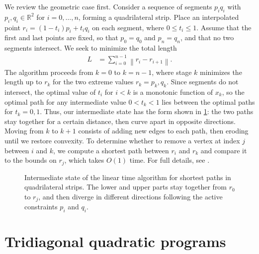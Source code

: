 \documentclass[11pt]{article}
\newcommand{\R}{\mathbb{R}}
\begin{document}
We review the geometric case first.  Consider a sequence of segments $p_i q_i$ with $p_i, q_i \in \R^2$ for $i = 0, \ldots, n$, forming a quadrilateral strip.  Place an interpolated point
$r_i = (1-t_i) p_i + t_i q_i$ on each segment, where $0 \le t_i \le 1$.  Assume that the first and last points are fixed, so that $p_0 = q_0$ and $p_n = q_n$, and that no two segments intersect.
We seek to minimize the total length
\begin{align*}
L &= \sum_{i=0}^{n-1} \left\| r_i - r_{i+1} \right\|.
\end{align*}
The algorithm proceeds from $k = 0$ to $k = n-1$, where stage $k$ minimizes the length up to $r_k$ for the two extreme values $r_k = p_k, q_k$.  Since segments do not intersect, the optimal value
of $t_i$ for $i < k$ is a monotonic function of $x_k$, so the optimal path for any intermediate value $0 < t_k < 1$ lies between the optimal paths for $t_k = 0,1$.  Thus, our intermediate state has the form shown in
\cref{kite}: the two paths stay together for a certain distance, then curve apart in opposite directions.  Moving from $k$ to $k+1$ consists of adding new edges to each path, then eroding until
we restore convexity.  To determine whether to remove a vertex at index $j$ between $i$ and $k$, we compute a shortest path between $r_i$ and $r_k$ and compare it to the bounds on $r_j$, which takes $O(1)$ time.
For full details, see \cite{lee1984euclidean}.

\begin{figure}
\begin{center}
\end{center}
\caption{Intermediate state of the linear time algorithm for shortest paths in quadrilateral strips.  The lower and upper parts stay together from $r_0$ to $r_j$, and then diverge in different directions
following the active constraints $p_i$ and $q_i$. \label{kite}}
\end{figure}

\section{Tridiagonal quadratic programs}
\end{document}
